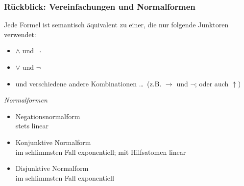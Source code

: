 \documentclass[aspectratio=1610,onlymath]{beamer}
\begin{document}
\begin{frame}\frametitle{Rückblick: Vereinfachungen und Normalformen}

Jede Formel ist semantisch äquivalent zu einer, die nur folgende Junktoren verwendet:
\begin{itemize}
\item $\wedge$ und $\neg$
\item $\vee$ und $\neg$
\item und verschiedene andere Kombinationen \ldots\ (z.B. $\to$ und $\neg$; oder auch $\uparrow$)
\end{itemize}\medskip

\emph{Normalformen}
\begin{itemize}
\item \alert{Negationsnormalform}\\
	stets linear
\item \alert{Konjunktive Normalform}\\
	im schlimmsten Fall exponentiell; mit Hilfsatomen linear
\item \alert{Disjunktive Normalform}\\
	im schlimmsten Fall exponentiell
\end{itemize}

\end{frame}



% 
% 
% 
\end{document}
